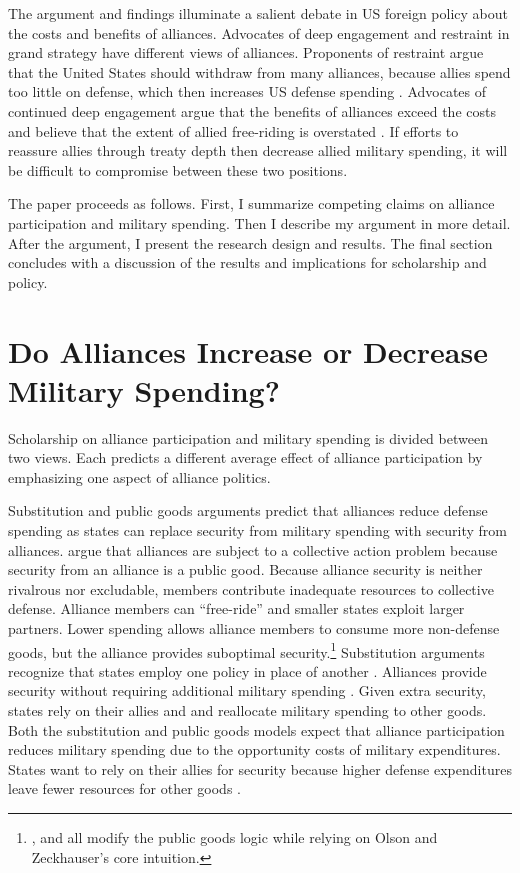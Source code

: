 \documentclass[12pt]{article}
\begin{document}
The argument and findings illuminate a salient debate in US foreign policy about the costs and benefits of alliances. 
Advocates of deep engagement \citep{Brooksetal2013} and restraint \citep{Posen2014} in grand strategy have different views of alliances. 
Proponents of restraint argue that the United States should withdraw from many alliances, because allies spend too little on defense, which then increases US defense spending \citep{Preble2009}.
Advocates of continued deep engagement argue that the benefits of alliances exceed the costs and believe that the extent of allied free-riding is overstated \citep{BrandsFeaver2017}. 
If efforts to reassure allies through treaty depth then decrease allied military spending, it will be difficult to compromise between these two positions.  


The paper proceeds as follows. 
First, I summarize competing claims on alliance participation and military spending. 
Then I describe my argument in more detail. 
After the argument, I present the research design and results. 
The final section concludes with a discussion of the results and implications for scholarship and policy.  



\section*{Do Alliances Increase or Decrease Military Spending?}


Scholarship on alliance participation and military spending is divided between two views.
Each predicts a different average effect of alliance participation by emphasizing one aspect of alliance politics.   


Substitution and public goods arguments predict that alliances reduce defense spending as states can replace security from military spending with security from alliances.
\citet{OlsonZeckhauser1966} argue that alliances are subject to a collective action problem because security from an alliance is a public good.
Because alliance security is neither rivalrous nor excludable, members contribute inadequate resources to collective defense. 
Alliance members can ``free-ride'' and smaller states exploit larger partners. 
Lower spending allows alliance members to consume more non-defense goods, but the alliance provides suboptimal security.\footnote{\citet{SandlerForbes1980}, \citet{Oneal1990} and \citet{SandlerHartley2001} all modify the public goods logic while relying on Olson and Zeckhauser's core intuition.} 
Substitution arguments recognize that states employ one policy in place of another \citep{MostStarr1989}.
Alliances provide security without requiring additional military spending \citep{Morrow1993, Conybeare1994}. 
Given extra security, states rely on their allies and and reallocate military spending to other goods. 
Both the substitution and public goods models expect that alliance participation reduces military spending due to the opportunity costs of military expenditures. 
States want to rely on their allies for security because higher defense expenditures leave fewer resources for other goods \citep{Fordham1998, Fearon2018}.
\end{document}
